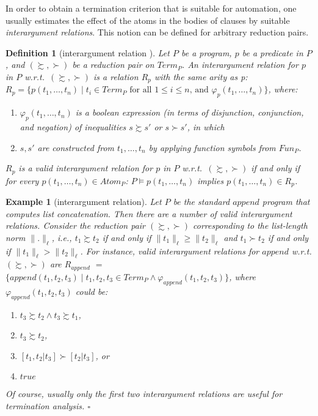 \documentclass[envcountsame]{tlp}
\newcounter{ex:der-lastsymconsctr}
\newtheorem{definition}{Definition}
\newtheorem{example}{Example}
\begin{document}
In order to obtain a termination criterion that is
suitable for automation, one usually estimates the effect of the atoms in the
bodies of clauses
by suitable \emph{interargument relations}. This notion can be defined for arbitrary
reduction pairs.


\begin{definition}[interargument relation
\cite{DeSchreyeSerebrenik01}]
\label{def:interargument} Let $P$ be a program, $p$ be a
predicate in $P$, and $(\succsim,\succ)$ be a reduction pair on $\mathit{Term}_P$. An
\emph{interargument relation} for $p$ in $P$ w.r.t.\ $(\succsim,\succ)$ is a relation
$R_p$ with the same arity as p:
$R_p=\{p(t_1,\ldots,t_n) \mid 
 t_i \in \mathit{Term}_P \mbox{ for all $1 \leq i \leq n$, and }
\varphi_p(t_1,\ldots,t_n)\}$, where:
\begin{enumerate}
\item[-] $\varphi_p(t_1,\ldots,t_n)$ is a boolean expression (in terms of
disjunction, conjunction, and negation) of inequalities $s \succsim s'$ or $s \succ s'$,
in which
\item[-] $s, s'$ are constructed from $t_1,\ldots,t_n$ by applying 
function symbols from $\mathit{Fun}_P$.
\end{enumerate}
$\mathit{R_p}$ is a \emph{valid} interargument relation for $\mathit{p}$ in $P$ w.r.t.\
$(\succsim,\succ)$ if and only if for every $p(t_1,\ldots,t_n) \in \mathit{Atom}_P$: $P
\models p(t_1,\ldots,t_n)$ implies $p(t_1,\ldots,t_n) \in R_p$.
\end{definition}

\begin{example}[interargument relation]\label{exam:interagr}
Let $P$ be the 
standard $\mathit{append}$ program that computes list concatenation. Then
there are a number of valid interargument
relations. Consider the reduction
pair $(\succsim,\succ)$ corresponding to the list-length norm ${\parallel}.{\parallel}_\ell$,
i.e., $t_1 \succsim t_2$ if and only if ${\parallel}t_1{\parallel}_\ell \ge
{\parallel}t_2{\parallel}_\ell$ and $t_1 \succ t_2$ if and only if
${\parallel}t_1{\parallel}_\ell > {\parallel}t_2{\parallel}_\ell$.
For instance, valid 
interargument relations for $append$ w.r.t. $(\succsim,\succ)$ are $R_{append}$
$=$ $\{append(t_1,t_2,t_3) \mid t_1,t_2,t_3 \in \mathit{Term}_P \wedge
\varphi_{append}(t_1,t_2,t_3) \}$, where $\varphi_{append}(t_1,t_2,t_3)$ could be:
\begin{enumerate}
\item[-] $t_3 \succsim t_2 \wedge t_3 \succsim t_1$,
\item[-] $t_3 \succsim t_2$,
\item[-] $[t_1,t_2|t_3] \succ [t_2|t_3]$, or
\item[-] $\mathit{true}$
\end{enumerate}
Of course, usually only the first two interargument relations
are useful for termination analysis.
{\hfill{$\mathit{\square}$}}
\end{example}
 
\end{document}
